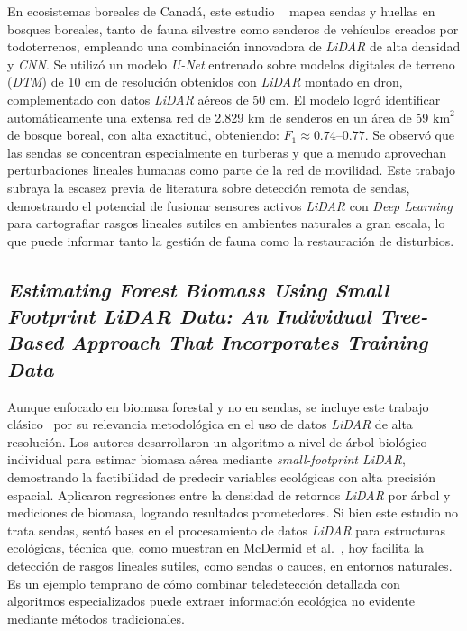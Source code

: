 En ecosistemas boreales de Canadá, este estudio ~\cite{McDermid2025} mapea sendas y huellas en bosques boreales, tanto de fauna silvestre como senderos de vehículos creados por todoterrenos, empleando una combinación innovadora de \textit{LiDAR} de alta densidad y \textit{CNN}. Se utilizó un modelo \textit{U-Net} entrenado sobre modelos digitales de terreno (\textit{DTM}) de 10 cm de resolución obtenidos con \textit{LiDAR} montado en dron, complementado con datos \textit{LiDAR} aéreos de 50 cm. El modelo logró identificar automáticamente una extensa red de 2.829 km de senderos en un área de 59 $\mathrm{km}^2$ de bosque boreal, con alta exactitud, obteniendo: $F_1 \approx 0.74$--$0.77$. Se observó que las sendas se concentran especialmente en turberas y que a menudo aprovechan perturbaciones lineales humanas como parte de la red de movilidad. Este trabajo subraya la escasez previa de literatura sobre detección remota de sendas, demostrando el potencial de fusionar sensores activos \textit{LiDAR} con \textit{Deep Learning} para cartografiar rasgos lineales sutiles en ambientes naturales a gran escala, lo que puede informar tanto la gestión de fauna como la restauración de disturbios.

\subsection { \textit{ Estimating Forest Biomass Using Small Footprint LiDAR Data: An Individual Tree-Based Approach That Incorporates Training Data}}

Aunque enfocado en biomasa forestal y no en sendas, se incluye este trabajo clásico~\cite{bortolot2005} por su relevancia metodológica en el uso de datos \textit{LiDAR} de alta resolución. Los autores desarrollaron un algoritmo a nivel de árbol biológico individual para estimar biomasa aérea mediante \textit{small-footprint LiDAR}, demostrando la factibilidad de predecir variables ecológicas con alta precisión espacial. Aplicaron regresiones entre la densidad de retornos \textit{LiDAR} por árbol y mediciones de biomasa, logrando resultados prometedores. Si bien este estudio no trata sendas, sentó bases en el procesamiento de datos \textit{LiDAR} para estructuras ecológicas, técnica que, como muestran en McDermid et al.~\cite{McDermid2025}, hoy facilita la detección de rasgos lineales sutiles, como sendas o cauces, en entornos naturales. Es un ejemplo temprano de cómo combinar teledetección detallada con algoritmos especializados puede extraer información ecológica no evidente mediante métodos tradicionales.

